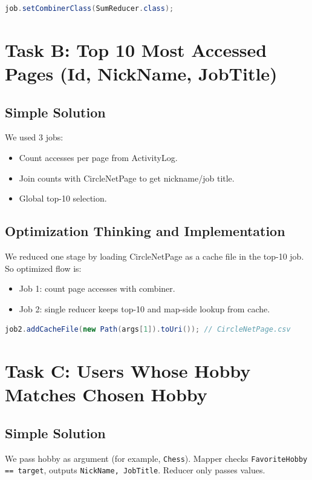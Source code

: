 \documentclass[11pt]{article}
\begin{document}
    \begin{lstlisting}[style=code,language=Java]
job.setCombinerClass(SumReducer.class);
    \end{lstlisting}

    \section{Task B: Top 10 Most Accessed Pages (Id, NickName, JobTitle)}
    \subsection*{Simple Solution}
    We used 3 jobs:
    \begin{itemize}
        \item Count accesses per page from ActivityLog.
        \item Join counts with CircleNetPage to get nickname/job title.
        \item Global top-10 selection.
    \end{itemize}

    \subsection*{Optimization Thinking and Implementation}
    We reduced one stage by loading CircleNetPage as a cache file in the top-10 job.
    So optimized flow is:
    \begin{itemize}
        \item Job 1: count page accesses with combiner.
        \item Job 2: single reducer keeps top-10 and map-side lookup from cache.
    \end{itemize}

    \begin{lstlisting}[style=code,language=Java]
job2.addCacheFile(new Path(args[1]).toUri()); // CircleNetPage.csv
    \end{lstlisting}

    \section{Task C: Users Whose Hobby Matches Chosen Hobby}
    \subsection*{Simple Solution}
    We pass hobby as argument (for example, \texttt{Chess}).
    Mapper checks \texttt{FavoriteHobby == target}, outputs \texttt{NickName, JobTitle}.
    Reducer only passes values.
\end{document}
